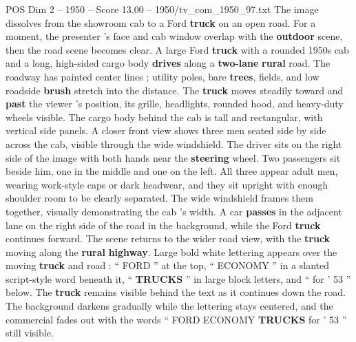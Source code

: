 \begin{textsample}{POS Dim 2 – 1950 – Score 13.00 – 1950/tv\_com\_1950\_97.txt}
The image dissolves from the showroom cab to a Ford \textbf{truck} on an open road.
For a moment, the presenter ’s face and cab window overlap with the \textbf{outdoor} scene, then the road scene becomes clear.
A large Ford \textbf{truck} with a rounded 1950s cab and a long, high-sided cargo body \textbf{drives} along a \textbf{two-lane} \textbf{rural} road.
The roadway has painted center lines ; utility poles, bare \textbf{trees}, fields, and low roadside \textbf{brush} stretch into the distance.
The \textbf{truck} moves steadily toward and \textbf{past} the viewer ’s position, its grille, headlights, rounded hood, and heavy-duty wheels visible.
The cargo body behind the cab is tall and rectangular, with vertical side panels.
A closer front view shows three men seated side by side across the cab, visible through the wide windshield.
The driver sits on the right side of the image with both hands near the \textbf{steering} wheel.
Two passengers sit beside him, one in the middle and one on the left.
All three appear adult men, wearing work-style caps or dark headwear, and they sit upright with enough shoulder room to be clearly separated.
The wide windshield frames them together, visually demonstrating the cab ’s width.
A car \textbf{passes} in the adjacent lane on the right side of the road in the background, while the Ford \textbf{truck} continues forward.
The scene returns to the wider road view, with the \textbf{truck} moving along the \textbf{rural} \textbf{highway}.
Large bold white lettering appears over the moving \textbf{truck} and road : “ FORD ” at the top, “ ECONOMY ” in a slanted script-style word beneath it, “ \textbf{TRUCKS} ” in large block letters, and “ for ’ 53 ” below.
The \textbf{truck} remains visible behind the text as it continues down the road.
The background darkens gradually while the lettering stays centered, and the commercial fades out with the words “ FORD ECONOMY \textbf{TRUCKS} for ’ 53 ” still visible.

\end{textsample}
